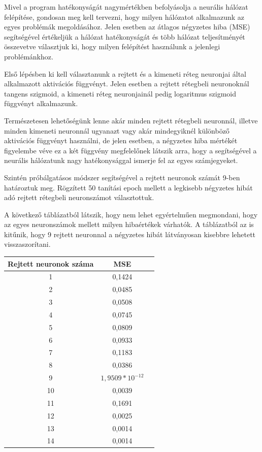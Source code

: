Mivel a program hatékonyságát nagymértékben befolyásolja a neurális hálózat felépítése, gondosan meg kell tervezni, hogy milyen hálózatot alkalmazunk az egyes problémák megoldásához. Jelen esetben az átlagos négyzetes hiba (MSE) segítségével értékeljük a hálózat hatékonyságát és több hálózat teljesítményét összevetve választjuk ki, hogy milyen felépítést használunk a jelenlegi problémánkhoz. 

Első lépésben ki kell választanunk a rejtett és a kimeneti réteg neuronjai által alkalmazott aktivációs függvényt. Jelen esetben a rejtett rétegbeli neuronoknál tangens szigmoid, a kimeneti réteg neuronjainál pedig logaritmus szigmoid függvényt alkalmazunk. 

Természetesen lehetőségünk lenne akár minden rejtett rétegbeli neuronnál, illetve minden kimeneti neuronnál ugyanazt vagy akár mindegyiknél különböző aktivációs függvényt használni, de jelen esetben, a négyzetes hiba mértékét figyelembe véve ez a két függvény megfelelőnek látszik arra, hogy a segítségével a neurális hálózatunk nagy hatékonysággal ismerje fel az egyes számjegyeket.

Szintén próbálgatásos módszer segítségével a rejtett neuronok számát 9-ben határoztuk meg. Rögzített 50 tanítási epoch mellett a legkisebb négyzetes hibát adó rejtett rétegbeli neuronszámot választottuk.

A következő táblázatból látszik, hogy nem lehet egyértelműen megmondani, hogy az egyes neuronszámok mellett milyen hibaértékek várhatók. A táblázatból az is kitűnik, hogy 9 rejtett neuronnal a négyzetes hibát látványosan kisebbre lehetett visszaszorítani. 

\begin{center}
\begin{tabular}{ |c|c|c| } 
 \hline
 Rejtett neuronok száma  & MSE  \\ 
 \hline\hline
 1 & 0,1424 \\
 \hline
 2 & 0,0485 \\
 \hline
 3 & 0,0508 \\
 \hline
 4 & 0,0745 \\
 \hline 
 5 & 0,0809 \\
 \hline
 6 & 0,0933 \\
 \hline
 7 & 0,1183 \\
 \hline 
 8 & 0,0386 \\
 \hline
 9 & $1,9509*10^{-12}$ \\
 \hline
 10 & 0,0039 \\
 \hline
 11 & 0,1691 \\
 \hline
 12 & 0,0025 \\
 \hline
 13 & 0,0014 \\
 \hline
 14 & 0,0014 \\
 \hline
\end{tabular}
\end{center} 

